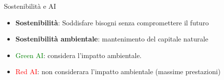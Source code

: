 \begin{frame}{Sostenibilità e AI} 
        \begin{itemize}
                \item \textbf{Sostenibilità}: Soddisfare bisogni senza compromettere il futuro
                \item \textbf{Sostenibilità ambientale}: mantenimento del capitale naturale
                \item \textcolor{green}{Green AI}: considera l'impatto ambientale.
                \item \textcolor{red}{Red AI}: non considerara l'impatto ambientale (massime prestazioni)
        \end{itemize}
\end{frame}

